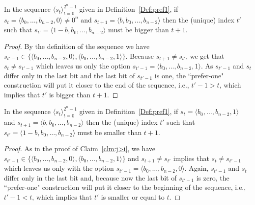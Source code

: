 \documentclass[final,12pt]{elsarticle}
\theoremstyle{definition} \newtheorem{definition}[theorem]{Definition} \newtheorem{observation}[theorem]{Observation} \newtheorem{example}[theorem]{Example} \newtheorem{remark}[theorem]{Remark} \newtheorem{corrolary}[theorem]{Corrolary}
\newcommand{\REF}[2]{#1~\ref{#2}}
\newcommand{\T}[1]{\langle{#1}\rangle}
\begin{document}
\begin{claim}
	\label{clm:j>i} In the sequence $
		\T{s_t}_{t=0}^{2^n-1}$ given in \REF{Definition}{Def:pref1}, if $s_t=\T{b_0,\dots,b_{n-2},0} \neq 0^n$ and $s_{t+1}=\T{b,b_0,\dots,b_{n-2}}$ then the (unique) index $t'$ such that $s_{t'}=\T{1-b,b_0,\dots,b_{n-2}}$ must be bigger than $t+1$.
\end{claim}
\begin{proof}
	By the definition of the sequence we have $s_{t'-1} \in \{ \T{b_0,\dots,b_{n-2},0}, \T{b_0,\dots,b_{n-2},1}\}$. Because $s_{t+1} \neq s_{t'}$, we get that $s_{t} \neq s_{t'-1}$ which leaves us only the option $s_{t'-1}=\T{b_0,\dots,b_{n-2},1}$. As $s_{t'-1}$ and $s_{t}$ differ only in the last bit and the last bit of $s_{t'-1}$ is one, the ``prefer-one" construction will put it closer to the end of the sequence, i.e., $t'-1 > t$, which implies that $t'$ is bigger than $t+1$.
\end{proof}

\begin{claim}
	\label{clm:j<i} In the sequence $
		\T{s_t}_{t=0}^{2^n-1}$ given in	\REF{Definition}{Def:pref1}, if $s_t=\T{b_0,\dots,b_{n-2},1}$ and $s_{t+1}=\T{b,b_0,\dots,b_{n-2}}$ then the (unique) index $t'$ such that $s_{t'}=\T{1-b,b_0,\dots,b_{n-2}}$ must be smaller than $t+1$.
\end{claim}
\begin{proof}
	As in the proof of \REF{Claim}{clm:j>i}, we have $s_{t'-1} \in \{ \T{b_0,\dots,b_{n-2},0}, \T{b_0,\dots,b_{n-2},1}\}$ and $s_{t+1} \neq s_{t'}$ implies that $s_{t} \neq s_{t'-1}$ which leaves us only with the option $s_{t'-1}=\T{b_0,\dots,b_{n-2},0}$. Again, $s_{t'-1}$ and $s_{t}$ differ only in the last bit and, because now the last bit of $s_{t'-1}$ is zero, the ``prefer-one" construction will put it closer to the beginning of the sequence, i.e., $t'-1 < t$, which implies that $t'$ is smaller or equal to $t$.
\end{proof}
\end{document}
